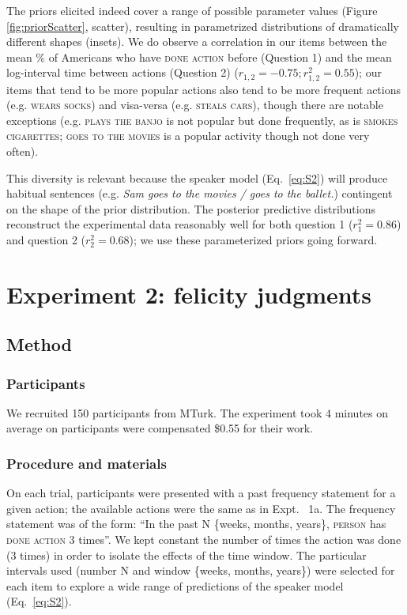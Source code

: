 \documentclass[10pt,letterpaper]{article}
\begin{document}
The priors elicited indeed cover a range of possible parameter values (Figure \ref{fig:priorScatter}, scatter), resulting in parametrized distributions of dramatically different shapes (insets).  
We do observe a correlation in our items between the mean \% of Americans who have \textsc{done action} before (Question 1) and the mean log-interval time between actions (Question 2) ($r_{1,2} = -0.75; r^2_{1,2} = 0.55$); our items that tend to be more popular actions also tend to be more frequent actions (e.g. \textsc{wears socks}) and visa-versa (e.g. \textsc{steals cars}), though there are notable exceptions (e.g. \textsc{plays the banjo} is not popular but done frequently, as is \textsc{smokes cigarettes}; \textsc{goes to the movies} is a popular activity though not done very often). 

This diversity is relevant because the speaker model (Eq.~\ref{eq:S2}) will produce habitual sentences (e.g. \emph{Sam goes to the movies / goes to the ballet.}) contingent on the shape of the prior distribution. 
The posterior predictive distributions reconstruct the experimental data reasonably well for both question 1 ($r^2_{1} = 0.86$) and question 2 ($r^2_{2} = 0.68$); we use these parameterized priors going forward.


\section{Experiment 2: felicity judgments}

\subsection{Method}

\subsubsection{Participants}

We recruited 150 participants from MTurk.
The experiment took 4 minutes on average on participants were compensated \$0.55 for their work.

\subsubsection{Procedure and materials}

On each trial, participants were presented with a past frequency statement for a given action; the available actions were the same as in Expt. ~1a. 
The frequency statement was of the form: ``In the past N \{weeks, months, years\}, \textsc{person} has \textsc{done action} 3 times''.
We kept constant the number of times the action was done (3 times) in order to isolate the effects of the time window. 
The particular intervals used (number N and window \{weeks, months, years\}) were selected for each item to explore a wide range of predictions of the speaker model (Eq.~\ref{eq:S2}).
\end{document}
